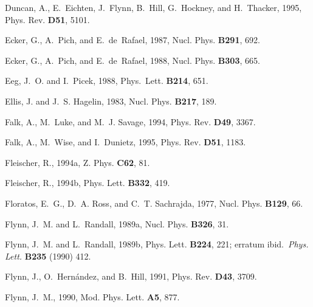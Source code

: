 \begin{thebibliography}{\protect{}1991}
Duncan, A., E.~Eichten, J.~Flynn, B.~Hill, G.~Hockney, and H.~Thacker, 1995,
\newblock Phys. Rev. {\bf D51}, 5101.

Ecker, G., A.~Pich, and E.~de~Rafael, 1987,
\newblock Nucl. Phys. {\bf B291}, 692.

Ecker, G., A.~Pich, and E.~de~Rafael, 1988,
\newblock Nucl. Phys. {\bf B303}, 665.

Eeg, J.~O. and I.~Picek, 1988,
\newblock Phys.~Lett. {\bf B214}, 651.

Ellis, J. and J.~S. Hagelin, 1983,
\newblock Nucl. Phys. {\bf B217}, 189.

Falk, A., M.~Luke, and M.~J. Savage, 1994,
\newblock Phys. Rev. {\bf D49}, 3367.

Falk, A., M.~Wise, and I.~Dunietz, 1995,
\newblock Phys. Rev. {\bf D51}, 1183.

Fleischer, R., 1994a,
\newblock Z. Phys. {\bf C62}, 81.

Fleischer, R., 1994b,
\newblock Phys. Lett. {\bf B332}, 419.

Floratos, E.~G., D.~A. Ross, and C.~T. Sachrajda, 1977,
\newblock Nucl. Phys. {\bf B129}, 66.

Flynn, J.~M. and L.~Randall, 1989a,
\newblock Nucl. Phys. {\bf B326}, 31.

Flynn, J.~M. and L.~Randall, 1989b,
\newblock Phys. Lett. {\bf B224}, 221; erratum ibid.\ {\em Phys. Lett.} {\bf
  B235} (1990) 412.

Flynn, J., O.~Hern\'{a}ndez, and B.~Hill, 1991,
\newblock Phys. Rev. {\bf D43}, 3709.

Flynn, J.~M., 1990,
\newblock Mod. Phys. Lett. {\bf A5}, 877.


\end{thebibliography}
